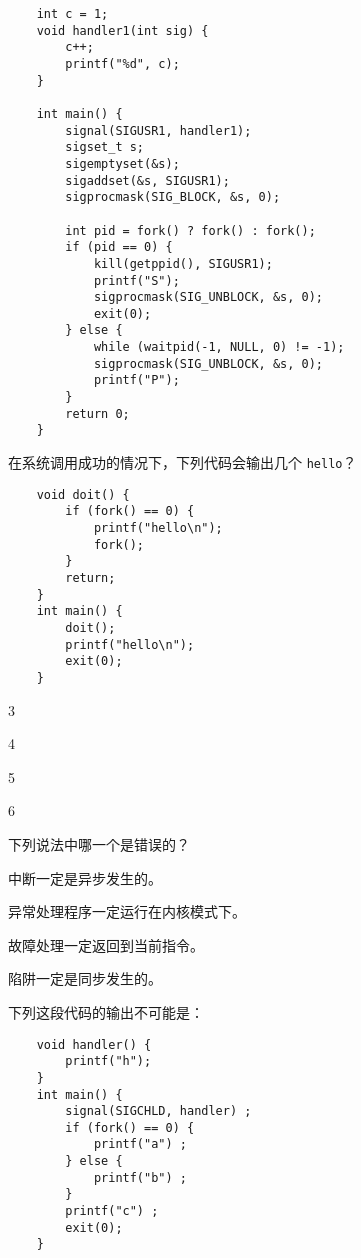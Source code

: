 \begin{problems}
\begin{verbatim}
    int c = 1;
    void handler1(int sig) {
        c++;
        printf("%d", c);
    }

    int main() {
        signal(SIGUSR1, handler1);
        sigset_t s;
        sigemptyset(&s);
        sigaddset(&s, SIGUSR1);
        sigprocmask(SIG_BLOCK, &s, 0);

        int pid = fork() ? fork() : fork();
        if (pid == 0) {
            kill(getppid(), SIGUSR1);
            printf("S");
            sigprocmask(SIG_UNBLOCK, &s, 0);
            exit(0);
        } else {
            while (waitpid(-1, NULL, 0) != -1);
            sigprocmask(SIG_UNBLOCK, &s, 0);
            printf("P");
        }
        return 0;
    }
        \end{verbatim}
         在系统调用成功的情况下，下列代码会输出几个 \verb|hello|？
        \begin{verbatim}
    void doit() {
        if (fork() == 0) {
            printf("hello\n");
            fork();
        }
        return;
    }
    int main() {
        doit();
        printf("hello\n");
        exit(0);
    }
        \end{verbatim}
        \begin{choices}
            \item 3
            \item 4
            \item 5
            \item 6
        \end{choices}
         下列说法中哪一个是错误的？
        \begin{choices}
            \item 中断一定是异步发生的。
            \item 异常处理程序一定运行在内核模式下。
            \item 故障处理一定返回到当前指令。
            \item 陷阱一定是同步发生的。
        \end{choices}
         下列这段代码的输出不可能是：
        \begin{verbatim}
    void handler() {
        printf("h");
    }
    int main() {
        signal(SIGCHLD, handler) ;
        if (fork() == 0) {
            printf("a") ;
        } else {
            printf("b") ;
        }
        printf("c") ;
        exit(0);
    }
        \end{verbatim}
        \begin{choices}

\end{choices}
\end{problems}
